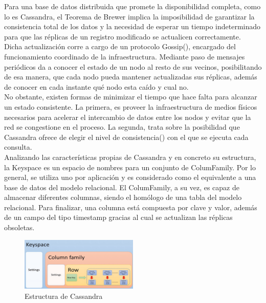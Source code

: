 Para una base de datos distribuida que promete la disponibilidad completa, como lo es Cassandra, el Teorema de Brewer implica la imposibilidad de garantizar la consistencia total de los datos y la necesidad de esperar un tiempo indeterminado para que las réplicas de un registro modificado se actualicen correctamente.\\

Dicha actualización corre a cargo de un protocolo Gossip(), encargado del funcionamiento coordinado de la infraestructura. Mediante paso de mensajes periódicos da a conocer el estado de un nodo al resto de sus vecinos, posibilitando de esa manera, que cada nodo pueda mantener actualizadas sus réplicas, además de conocer en cada instante qué nodo esta caído y cual no.\\

No obstante, existen formas de minimizar el tiempo que hace falta para alcanzar un estado consistente. La primera, es proveer la infraestructura de medios físicos necesarios para acelerar el intercambio de datos entre los nodos y evitar que la red se congestione en el proceso. La segunda, trata sobre la posibilidad que Cassandra ofrece de elegir el nivel de consistencia() con el que se ejecuta cada consulta.\\

Analizando las características propias de Cassandra y en concreto su estructura, la Keyspace es un espacio de nombres para un conjunto de ColumFamily. Por lo general, se utiliza uno por aplicación y es considerado como el equivalente a una base de datos del modelo relacional. El ColumFamily, a su vez, es capaz de almacenar diferentes columnas, siendo el homólogo de una tabla del modelo relacional. Para finalizar, una columna está compuesta por clave y valor, además de un campo del tipo timestamp gracias al cual se actualizan las réplicas obsoletas.\\

\begin{figure}[h]
	\centering
	\includegraphics[width=0.5\textwidth]{Ilustraciones/cassandra_infraestructure.png}
	\caption{Estructura de Cassandra}
	\label{fig:cassandra_infraestructure}
\end{figure}

